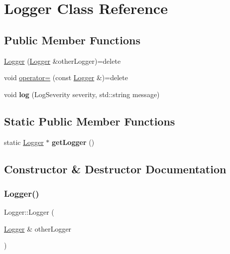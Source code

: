 \hypertarget{classLogger}{}\section{Logger Class Reference}
\label{classLogger}
\subsection*{Public Member Functions}
\begin{DoxyCompactItemize}
\item 
\hyperlink{classLogger_ae69a3a7895a51631400ea34f7cd7b915}{Logger} (\hyperlink{classLogger}{Logger} \&other\+Logger)=delete
\item 
void \hyperlink{classLogger_af7266f0b4cc9b6c05a20fb76b96c4ada}{operator=} (const \hyperlink{classLogger}{Logger} \&)=delete
\item 
\mbox{\label{classLogger_acf7e80e0ea2dc9e8104459e2c6bfee4f}} 
void {\bfseries log} (Log\+Severity severity, std\+::string message)
\end{DoxyCompactItemize}
\subsection*{Static Public Member Functions}
\begin{DoxyCompactItemize}
\item 
\mbox{\label{classLogger_aa6f6d11f892277aacaf0fe1db82e6829}} 
static \hyperlink{classLogger}{Logger} $\ast$ {\bfseries get\+Logger} ()
\end{DoxyCompactItemize}


\subsection{Constructor \& Destructor Documentation}
\mbox{\label{classLogger_ae69a3a7895a51631400ea34f7cd7b915}} 
\subsubsection{\texorpdfstring{Logger()}{Logger()}}
{\footnotesize\ttfamily Logger\+::\+Logger (\begin{DoxyParamCaption}\item[{\hyperlink{classLogger}{Logger} \&}]{other\+Logger }\end{DoxyParamCaption})\hspace{0.3cm}{\ttfamily [delete]}}

